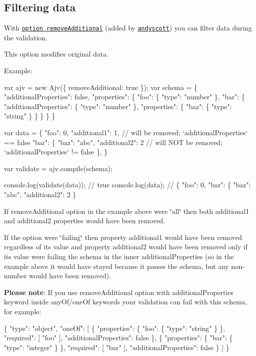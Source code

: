 \subsection*{Filtering data}

With \href{#options}{\tt option {\ttfamily remove\+Additional}} (added by \href{https://github.com/andyscott}{\tt andyscott}) you can filter data during the validation.

This option modifies original data.

Example\+:


\begin{DoxyCode}
var ajv = new Ajv(\{ removeAdditional: true \});
var schema = \{
  "additionalProperties": false,
  "properties": \{
    "foo": \{ "type": "number" \},
    "bar": \{
      "additionalProperties": \{ "type": "number" \},
      "properties": \{
        "baz": \{ "type": "string" \}
      \}
    \}
  \}
\}

var data = \{
  "foo": 0,
  "additional1": 1, // will be removed; `additionalProperties` == false
  "bar": \{
    "baz": "abc",
    "additional2": 2 // will NOT be removed; `additionalProperties` != false
  \},
\}

var validate = ajv.compile(schema);

console.log(validate(data)); // true
console.log(data); // \{ "foo": 0, "bar": \{ "baz": "abc", "additional2": 2 \}
\end{DoxyCode}


If {\ttfamily remove\+Additional} option in the example above were {\ttfamily \char`\"{}all\char`\"{}} then both {\ttfamily additional1} and {\ttfamily additional2} properties would have been removed.

If the option were {\ttfamily \char`\"{}failing\char`\"{}} then property {\ttfamily additional1} would have been removed regardless of its value and property {\ttfamily additional2} would have been removed only if its value were failing the schema in the inner {\ttfamily additional\+Properties} (so in the example above it would have stayed because it passes the schema, but any non-\/number would have been removed).

{\bfseries Please note}\+: If you use {\ttfamily remove\+Additional} option with {\ttfamily additional\+Properties} keyword inside {\ttfamily any\+Of}/{\ttfamily one\+Of} keywords your validation can fail with this schema, for example\+:


\begin{DoxyCode}
\{
  "type": "object",
  "oneOf": [
    \{
      "properties": \{
        "foo": \{ "type": "string" \}
      \},
      "required": [ "foo" ],
      "additionalProperties": false
    \},
    \{
      "properties": \{
        "bar": \{ "type": "integer" \}
      \},
      "required": [ "bar" ],
      "additionalProperties": false
    \}
  ]
\}
\end{DoxyCode}


